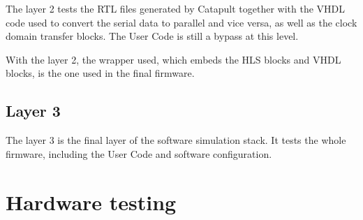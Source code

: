 The layer 2 tests the RTL files generated by Catapult together with the VHDL code used to convert the serial data to parallel and vice versa, as well as the clock domain transfer blocks. The User Code is still a bypass at this level. 

With the layer 2, the wrapper used, which embeds the HLS blocks and VHDL blocks, is the one used in the final firmware.

\subsection{Layer 3}

The layer 3 is the final layer of the software simulation stack. It tests the whole firmware, including the User Code and software configuration.

\section{Hardware testing}
